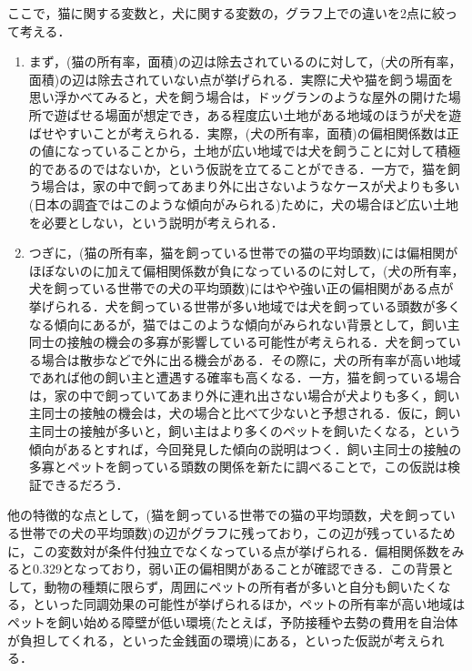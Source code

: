 \documentclass[11pt,dvipdfmx]{jarticle}
\theoremstyle{definition}
\begin{document}
ここで，猫に関する変数と，犬に関する変数の，グラフ上での違いを2点に絞って考える．
\begin{enumerate}
    \item まず，(猫の所有率，面積)の辺は除去されているのに対して，(犬の所有率，面積)の辺は除去されていない点が挙げられる．実際に犬や猫を飼う場面を思い浮かべてみると，犬を飼う場合は，ドッグランのような屋外の開けた場所で遊ばせる場面が想定でき，ある程度広い土地がある地域のほうが犬を遊ばせやすいことが考えられる．実際，(犬の所有率，面積)の偏相関係数は正の値になっていることから，土地が広い地域では犬を飼うことに対して積極的であるのではないか，という仮説を立てることができる．一方で，猫を飼う場合は，家の中で飼ってあまり外に出さないようなケースが犬よりも多い(日本の調査\cite{pet_survey}ではこのような傾向がみられる)ために，犬の場合ほど広い土地を必要としない，という説明が考えられる．
    \item つぎに，(猫の所有率，猫を飼っている世帯での猫の平均頭数)には偏相関がほぼないのに加えて偏相関係数が負になっているのに対して，(犬の所有率，犬を飼っている世帯での犬の平均頭数)にはやや強い正の偏相関がある点が挙げられる．犬を飼っている世帯が多い地域では犬を飼っている頭数が多くなる傾向にあるが，猫ではこのような傾向がみられない背景として，飼い主同士の接触の機会の多寡が影響している可能性が考えられる．犬を飼っている場合は散歩などで外に出る機会がある．その際に，犬の所有率が高い地域であれば他の飼い主と遭遇する確率も高くなる．一方，猫を飼っている場合は，家の中で飼っていてあまり外に連れ出さない場合が犬よりも多く\cite{pet_survey}，飼い主同士の接触の機会は，犬の場合と比べて少ないと予想される．仮に，飼い主同士の接触が多いと，飼い主はより多くのペットを飼いたくなる，という傾向があるとすれば，今回発見した傾向の説明はつく．飼い主同士の接触の多寡とペットを飼っている頭数の関係を新たに調べることで，この仮説は検証できるだろう．
\end{enumerate}

他の特徴的な点として，(猫を飼っている世帯での猫の平均頭数，犬を飼っている世帯での犬の平均頭数)の辺がグラフに残っており，この辺が残っているために，この変数対が条件付独立でなくなっている点が挙げられる．偏相関係数をみると0.329となっており，弱い正の偏相関があることが確認できる．この背景として，動物の種類に限らず，周囲にペットの所有者が多いと自分も飼いたくなる，といった同調効果の可能性が挙げられるほか，ペットの所有率が高い地域はペットを飼い始める障壁が低い環境(たとえば，予防接種や去勢の費用を自治体が負担してくれる，といった金銭面の環境)にある，といった仮説が考えられる．
\end{document}
